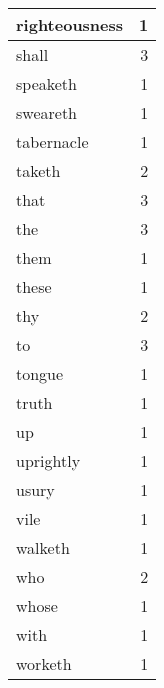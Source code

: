 \begin{center}
\begin{longtable}{l|r}
righteousness & 1 \\ \hline
shall & 3 \\ \hline
speaketh & 1 \\ \hline
sweareth & 1 \\ \hline
tabernacle & 1 \\ \hline
taketh & 2 \\ \hline
that & 3 \\ \hline
the & 3 \\ \hline
them & 1 \\ \hline
these & 1 \\ \hline
thy & 2 \\ \hline
to & 3 \\ \hline
tongue & 1 \\ \hline
truth & 1 \\ \hline
up & 1 \\ \hline
uprightly & 1 \\ \hline
usury & 1 \\ \hline
vile & 1 \\ \hline
walketh & 1 \\ \hline
who & 2 \\ \hline
whose & 1 \\ \hline
with & 1 \\ \hline
worketh & 1 \\ \hline
\end{longtable}
\end{center}



\normalsize



